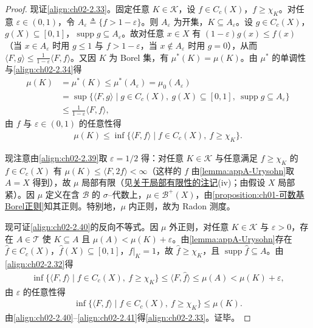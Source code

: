 \documentclass[../../main.tex]{subfiles}%
\begin{document}
\begin{proof}
现证\eqref{align:ch02-2.33}。固定任意 $K\in\mathscr K$，设 $f\in C_c(X)$，$f\geqslant\chi_K$。对任意 $\varepsilon\in(0,1)$，令 $A_\varepsilon\triangleq\{f>1-\varepsilon\}$。则 $A_\varepsilon$ 为开集，$K\subseteq A_\varepsilon$。设 $g\in C_c(X)$，$g(X)\subseteq[0,1]$，$\operatorname{supp}g\subseteq A_\varepsilon$。故对任意 $x\in X$ 有 $(1-\varepsilon)g(x)\leqslant f(x)$（当 $x\in A_\varepsilon$ 时用 $g\leqslant1$ 与 $f>1-\varepsilon$，当 $x\notin A_\varepsilon$ 时用 $g=0$），从而 $\langle F,g\rangle\leqslant\frac1{1-\varepsilon}\langle F,f\rangle$。又因 $K$ 为 Borel 集，有 $\mu^*(K)=\mu(K)$。由 $\mu^*$ 的单调性与\eqref{align:ch02-2.34}得
\begin{align}
\mu(K)&=\mu^*(K)\leqslant\mu^*(A_\varepsilon)=\mu_0(A_\varepsilon)\nonumber\\
&=\sup\{\langle F,g\rangle\mid g\in C_c(X),\ g(X)\subseteq[0,1],\ \operatorname{supp}g\subseteq A_\varepsilon\}\nonumber\\
&\leqslant\frac1{1-\varepsilon}\langle F,f\rangle, \label{align:ch02-2.39}
\end{align}
由 $f$ 与 $\varepsilon\in(0,1)$ 的任意性得
\begin{align}
\mu(K)\leqslant\inf\{\langle F,f\rangle\mid f\in C_c(X),\ f\geqslant\chi_K\}. \label{align:ch02-2.40}
\end{align}

现注意由\eqref{align:ch02-2.39}取 $\varepsilon=1/2$ 得：对任意 $K\in\mathscr K$ 与任意满足 $f\geqslant\chi_K$ 的 $f\in C_c(X)$ 有 $\mu(K)\leqslant\langle F,2f\rangle<\infty$（这样的 $f$ 由\cref{lemma:appA-Urysohn}取 $A=X$ 得到），故 $\mu$ 局部有限（见\hyperref[remark:ch01-局部有限]{关于局部有限性的注记}(iv)；由假设 $X$ 局部紧）。因 $\mu$ 定义在含 $\mathscr B$ 的 $\sigma$--代数上，$\mu\in\mathscr B^+(X)$，由\cref{proposition:ch01-可数基Borel正则}知其正则。特别地，$\mu$ 内正则，故为 Radon 测度。

现可证\eqref{align:ch02-2.40}的反向不等式。因 $\mu$ 外正则，对任意 $K\in\mathscr K$ 与 $\varepsilon>0$，存在 $A\in\mathscr T$ 使 $K\subseteq A$ 且 $\mu(A)<\mu(K)+\varepsilon$。由\cref{lemma:appA-Urysohn}存在 $\hat f\in C_c(X)$，$\hat f(X)\subseteq[0,1]$，$\hat f|_K=1$，故 $\hat f\geqslant\chi_K$，且 $\operatorname{supp}\hat f\subseteq A$。由\eqref{align:ch02-2.32}得
\begin{align*}
\inf\{\langle F,f\rangle\mid f\in C_c(X),\ f\geqslant\chi_K\}\leqslant\langle F,\hat f\rangle\leqslant\mu(A)<\mu(K)+\varepsilon,
\end{align*}
由 $\varepsilon$ 的任意性得
\begin{align}
\inf\{\langle F,f\rangle\mid f\in C_c(X),\ f\geqslant\chi_K\}\leqslant\mu(K). \label{align:ch02-2.41}
\end{align}
由\eqref{align:ch02-2.40}--\eqref{align:ch02-2.41}得\eqref{align:ch02-2.33}。证毕。
\end{proof}
\end{document}
